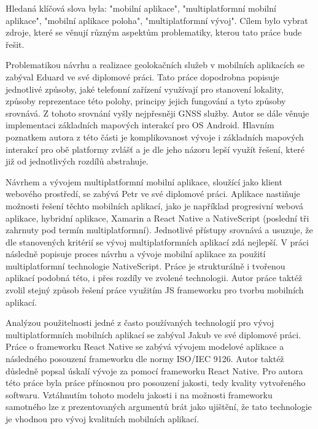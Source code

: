 Hledaná klíčová slova byla: "mobilní aplikace", "multiplatformní mobilní aplikace", "mobilní aplikace poloha", "multiplatformní vývoj". Cílem bylo vybrat zdroje, které se věnují různým aspektům problematiky, kterou tato práce bude řešit.

Problematikou návrhu a realizace geolokačních služeb v mobilních aplikacích se zabýval Eduard  \textcite{Bakes2018thesis} ve své diplomové práci. Tato práce dopodrobna popisuje jednotlivé způsoby, jaké telefonní zařízení využívají pro stanovení lokality, způsoby reprezentace této polohy, principy jejich fungování a tyto způsoby srovnává. Z tohoto srovnání vyšly nejpřesněji GNSS služby. Autor se dále věnuje implementaci základních mapových interakcí pro OS Android. Hlavním poznatkem autora z této části je komplikovanost vývoje i základních mapových interakcí pro obě platformy zvlášť a je dle jeho názoru lepší využít řešení, které již od jednotlivých rozdílů abstrahuje.


Návrhem a vývojem multiplatformní mobilní aplikace, sloužící jako klient webového prostředí, se zabývá Petr \textcite{Domkar2018} ve své diplomové práci. Aplikace nastiňuje možnosti řešení těchto mobilních aplikací, jako je například progresivní webová aplikace, hybridní aplikace, Xamarin a React Native a NativeScript (poslední tři zahrnuty pod termín multiplatformní). Jednotlivé přístupy srovnává a usuzuje, že dle stanovených kritérií se vývoj multiplatformních aplikací zdá nejlepší. V práci následně popisuje proces návrhu a vývoje mobilní aplikace za použití multiplatformní technologie NativeScript. Práce je strukturálně i tvořenou aplikací podobná této, i přes rozdíly ve zvolené technologii. Autor práce taktéž zvolil stejný způsob řešení práce využitím JS frameworku pro tvorbu mobilních aplikací.

Analýzou použitelnosti jedné z často používaných technologií pro vývoj multiplatformních mobilních aplikací se zabýval Jakub \textcite{Menda2018thesis} ve své diplomové práci. Práce o frameworku React Native se zabývá vývojem modelové aplikace a následného posouzení frameworku dle normy ISO/IEC 9126. Autor taktéž důsledně popsal úskalí vývoje za pomocí frameworku React Native. Pro autora této práce byla práce přínosnou pro posouzení jakosti, tedy kvality vytvořeného softwaru. Vztáhnutím tohoto modelu jakosti i na možnosti frameworku samotného lze z prezentovaných argumentů brát jako ujištění, že tato technologie je vhodnou pro vývoj kvalitních mobilních aplikací.

